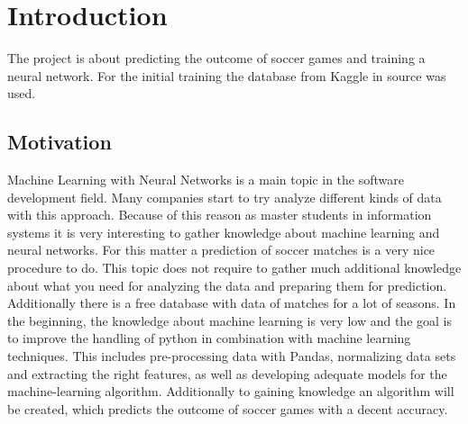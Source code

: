 
\chapter{Introduction}

The project is about predicting the outcome of soccer games and training a neural network. For the initial training the database from Kaggle in source \cite{kggl:2019} was used. 


\section{Motivation}
Machine Learning with Neural Networks is a main topic in the software development field. Many companies start to try analyze different kinds of data with this approach. Because of this reason as master students in information systems it is very interesting to gather knowledge about machine learning and neural networks. For this matter a prediction of soccer matches is a very nice procedure to do. This topic does not require to gather much additional knowledge about what you need for analyzing the data and preparing them for prediction. Additionally there is a free database with data of matches for a lot of seasons. In the beginning, the knowledge about machine learning is very low and the goal is to improve the handling of python in combination with machine learning techniques. This includes pre-processing data with Pandas, normalizing data sets and extracting the right features, as well as developing adequate models for the machine-learning algorithm. Additionally to gaining knowledge an algorithm will be created, which predicts the outcome of soccer games with a decent accuracy.
